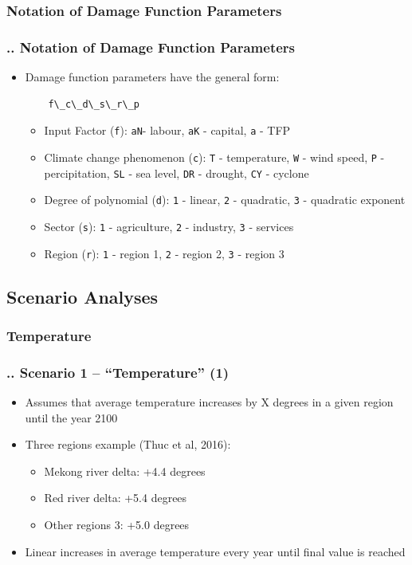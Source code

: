 \documentclass[11pt,aspectratio=169]{beamer}
\begin{document}
\subsubsection{Notation of Damage Function Parameters}
\begin{frame}[fragile]
\frametitle{{\thesection.\thesubsection.\thesubsubsection} Notation of Damage Function Parameters}
\begin{itemize}
\item Damage function parameters have the general form:
\begin{verbatim}
	f\_c\_d\_s\_r\_p
\end{verbatim}
\begin{itemize}
\item Input Factor (\texttt{f}): \texttt{aN}- labour, \texttt{aK} - capital, \texttt{a} - TFP
\item Climate change phenomenon (\texttt{c}): \texttt{T} - temperature, \texttt{W} - wind speed, \texttt{P} - percipitation, \texttt{SL} - sea level, \texttt{DR} - drought, \texttt{CY} - cyclone
\item Degree of polynomial (\texttt{d}): \texttt{1} - linear, \texttt{2} - quadratic, \texttt{3} - quadratic exponent
\item Sector (\texttt{s}): \texttt{1} - agriculture, \texttt{2} - industry, \texttt{3} - services
\item Region (\texttt{r}): \texttt{1} - region 1, \texttt{2} - region 2, \texttt{3} - region 3
\end{itemize}
\end{itemize}
\end{frame}

\subsection{Scenario Analyses}
\subsubsection{Temperature}
\begin{frame}
\frametitle{{\thesection.\thesubsection.\thesubsubsection} Scenario 1 -- "`Temperature"' (1)}
\begin{itemize}
\item Assumes that average temperature increases by X degrees in a given region until the year 2100
\item Three regions example (Thuc et al, 2016):
	\begin{itemize}
		\item Mekong river delta: +4.4 degrees
		\item Red river delta: +5.4 degrees
		\item Other regions 3: +5.0 degrees
	\end{itemize}
 \item Linear increases in average temperature every year until final value is reached
\end{itemize}
\end{frame}
\end{document}
